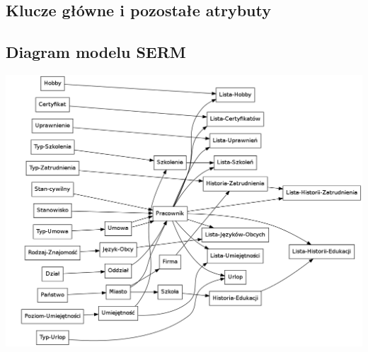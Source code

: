 \documentclass[a4paper]{article}
\begin{document}


\subsection{Klucze główne i pozostałe atrybuty}


\subsection{Diagram modelu SERM}
\includegraphics[width=\textwidth]{tex/srem.png}
\end{document}
